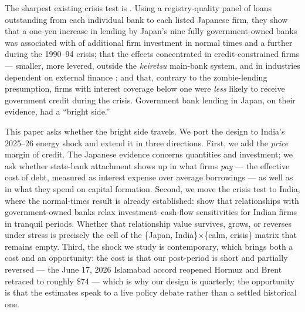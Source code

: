 \documentclass[12pt]{article}
\begin{document}
The sharpest existing crisis test is \citet{lin2015government}. Using a registry-quality
panel of loans outstanding from each individual bank to each listed Japanese firm, they show
that a one-yen increase in lending by Japan's nine fully government-owned banks was
associated with  of additional firm investment in normal times and a further
 during the 1990--94 crisis; that the effects concentrated in credit-constrained
firms --- smaller, more levered, outside the \emph{keiretsu} main-bank system, and in
industries dependent on external finance \citep{rajan1998}; and that, contrary to the
zombie-lending presumption, firms with interest coverage below one were \emph{less} likely
to receive government credit during the crisis. Government bank lending in Japan, on their
evidence, had a ``bright side.''

This paper asks whether the bright side travels. We port the design to India's 2025--26
energy shock and extend it in three directions. First, we add the \emph{price} margin of
credit. The Japanese evidence concerns quantities and investment; we ask whether state-bank
attachment shows up in what firms \emph{pay} --- the effective cost of debt, measured as
interest expense over average borrowings --- as well as in what they spend on capital
formation. Second, we move the crisis test to India, where the normal-times result is
already established: \citet{srinivasan2017} show that relationships with government-owned
banks relax investment--cash-flow sensitivities for Indian firms in tranquil periods. Whether
that relationship value survives, grows, or reverses under stress is precisely the cell of
the \{Japan, India\}$\times$\{calm, crisis\} matrix that remains empty. Third, the shock we
study is contemporary, which brings both a cost and an opportunity: the cost is that our
post-period is short and partially reversed --- the June 17, 2026 Islamabad accord reopened
Hormuz and Brent retraced to roughly \$74 --- which is why our design is quarterly; the
opportunity is that the estimates speak to a live policy debate rather than a settled
historical one.
\end{document}
